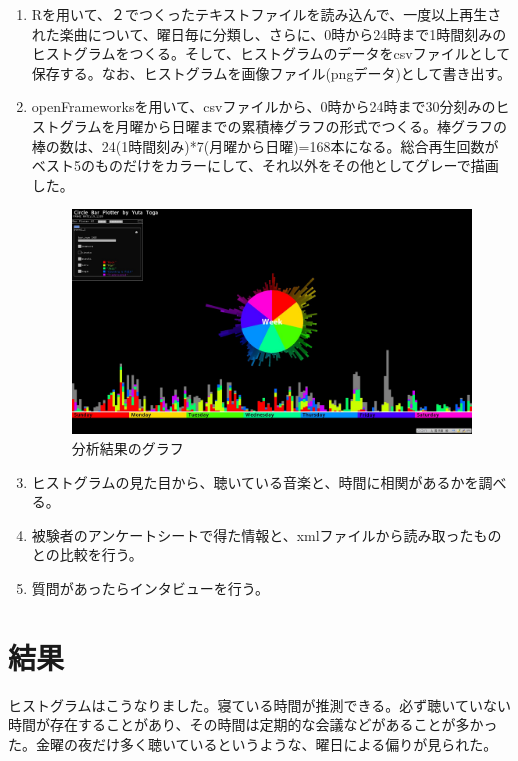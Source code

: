 \documentclass{jsarticle}
\begin{document}
\begin{enumerate}
\item
Rを用いて、２でつくったテキストファイルを読み込んで、一度以上再生された楽曲について、曜日毎に分類し、さらに、0時から24時まで1時間刻みのヒストグラムをつくる。そして、ヒストグラムのデータをcsvファイルとして保存する。なお、ヒストグラムを画像ファイル(pngデータ)として書き出す。

\item
openFrameworksを用いて、csvファイルから、0時から24時まで30分刻みのヒストグラムを月曜から日曜までの累積棒グラフの形式でつくる。棒グラフの棒の数は、24(1時間刻み)*7(月曜から日曜)=168本になる。総合再生回数がベスト5のものだけをカラーにして、それ以外をその他としてグレーで描画した。

\begin{figure}
\begin{center}
\includegraphics[width=14cm]{graph_sample.jpg}
\caption{分析結果のグラフ}
\end{center}
\end{figure}

\item
ヒストグラムの見た目から、聴いている音楽と、時間に相関があるかを調べる。

\item
被験者のアンケートシートで得た情報と、xmlファイルから読み取ったものとの比較を行う。

\item
質問があったらインタビューを行う。

\end{enumerate}

\section{結果}

ヒストグラムはこうなりました。寝ている時間が推測できる。必ず聴いていない時間が存在することがあり、その時間は定期的な会議などがあることが多かった。金曜の夜だけ多く聴いているというような、曜日による偏りが見られた。
\end{document}
